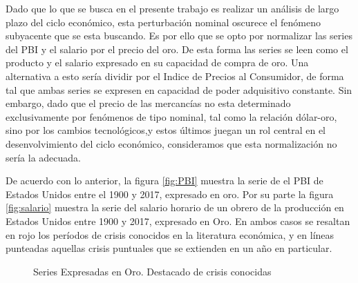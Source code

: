 \documentclass[a4paper]{article}
\begin{document}
Dado que lo que se busca en el presente trabajo es realizar un análisis de largo plazo del ciclo económico, esta perturbación nominal oscurece el fenómeno subyacente que se esta buscando. Es por ello que se opto por normalizar las series del PBI y el salario por el precio del oro. De esta forma las series se leen como el producto y el salario expresado en su capacidad de compra de oro. Una alternativa a esto sería dividir por el Indice de Precios al Consumidor, de forma tal que ambas series se expresen en capacidad de poder adquisitivo constante. Sin embargo, dado que el precio de las mercancías no esta determinado exclusivamente por fenómenos de tipo nominal, tal como la relación dólar-oro, sino por los cambios tecnológicos,y estos últimos juegan un rol central en el desenvolvimiento del ciclo económico, consideramos que esta normalización no sería la adecuada. 

De acuerdo con lo anterior, la figura \ref{fig:PBI} muestra la serie de el PBI de Estados Unidos entre el 1900 y 2017, expresado en oro. Por su parte la figura \ref{fig:salario} muestra la serie del salario horario de un obrero de la producción en Estados Unidos entre 1900 y 2017, expresado en Oro. En ambos casos se resaltan en rojo los períodos de crisis conocidos en la literatura económica, y en líneas punteadas aquellas crisis puntuales que se extienden en un año en particular.

\begin{figure}[H]
	\centering
	\caption{Series Expresadas en Oro. Destacado de crisis conocidas} \label{fig:series_crisis}
\end{figure}
\end{document}
